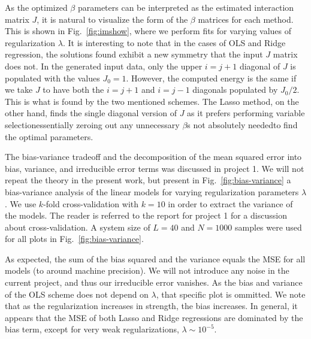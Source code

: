 \documentclass[a4paper, twocolumn]{article}
\newcommand{\fig}[1]{Fig.\ \ref{fig:#1}}
\begin{document}
As the optimized $\beta$ parameters can be interpreted as the estimated interaction matrix $J$, it is natural to visualize the form of the $\beta$ matrices for each method. This is shown in \fig{imshow}, where we perform fits for varying values of regularization $\lambda$. It is interesting to note that in the cases of OLS and Ridge regression, the solutions found exhibit a new symmetry that the input $J$ matrix does not. In the generated input data, only the upper $i=j+1$ diagonal of $J$ is populated with the values $J_0=1$. However, the computed energy is the same if we take $J$ to have both the $i=j+1$ and $i=j-1$ diagonals populated by $J_0/2$. This is what is found by the two mentioned schemes. The Lasso method, on the other hand, finds the single diagonal version of $J$ as it prefers performing variable selection\textemdash essentially zeroing out any unnecessary $\beta$s not absolutely needed\textemdash to find the optimal parameters.

The bias-variance tradeoff and the decomposition of the mean squared error into bias, variance, and irreducible error terms was discussed in project 1. We will not repeat the theory in the present work, but present in \fig{bias-variance} a bias-variance analysis of the linear models for varying regularization parameters $\lambda$. We use $k$-fold cross-validation with $k=10$ in order to extract the variance of the models. The reader is referred to the report for project 1 for a discussion about cross-validation. A system size of $L=40$ and $N=1000$ samples were used for all plots in \fig{bias-variance}. 

As expected, the sum of the bias squared and the variance equals the MSE for all models (to around machine precision). We will not introduce any noise in the current project, and thus our irreducible error vanishes. As the bias and variance of the OLS scheme does not depend on $\lambda$, that specific plot is ommitted. We note that as the regularization increases in strength, the bias increases. In general, it appears that the MSE of both Lasso and Ridge regressions are dominated by the bias term, except for very weak regularizations, $\lambda\sim10^{-5}$.
\end{document}
